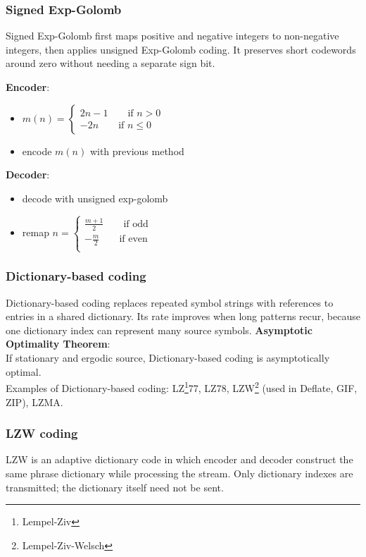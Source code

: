 \subsubsection{Signed Exp-Golomb}
Signed Exp-Golomb first maps positive and negative integers to non-negative integers, then applies unsigned Exp-Golomb coding. It preserves short codewords around zero without needing a separate sign bit.
\begin{minipage}{0.5\textwidth}
    \textbf{Encoder}:
    \begin{itemize}
        \item $m(n) = \begin{cases}
            2n-1 \qquad \text{if }n>0\\
            -2n \qquad \text{if }n\leq0
        \end{cases}$
        \item encode $m(n)$ with previous method
    \end{itemize}
\end{minipage}
\begin{minipage}{0.5\textwidth}
    \textbf{Decoder}:
    \begin{itemize}
        \item decode with unsigned exp-golomb
        \item remap $n = \begin{cases}
            \frac{m+1}{2} \qquad \text{if odd}\\
            -\frac{m}{2} \qquad \text{if even}\\
        \end{cases}$
    \end{itemize}
\end{minipage}
\subsubsection{Dictionary-based coding}
Dictionary-based coding replaces repeated symbol strings with references to entries in a shared dictionary. Its rate improves when long patterns recur, because one dictionary index can represent many source symbols.
\textbf{Asymptotic Optimality Theorem}:\\
If stationary and ergodic source, Dictionary-based coding is asymptotically optimal.\\
Examples of Dictionary-based coding: LZ\footnote{Lempel-Ziv}77, LZ78, LZW\footnote{Lempel-Ziv-Welsch} (used in Deflate, GIF, ZIP), LZMA.
\subsubsection{LZW coding}
LZW is an adaptive dictionary code in which encoder and decoder construct the same phrase dictionary while processing the stream. Only dictionary indexes are transmitted; the dictionary itself need not be sent.

